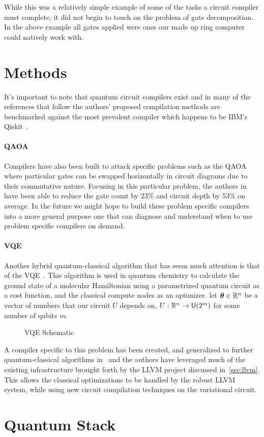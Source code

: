 While this was a relatively simple example of some of the tasks a circuit compiler must complete, it did not begin to touch on the problem of gate decomposition.
In the above example all gates applied were ones our made up ring computer could natively work with.


\section{Methods}

It's important to note that quantum circuit compilers exist and in many of the references that follow the authors' proposed compilation methods are benchmarked against the most prevalent compiler which happens to be IBM's Qiskit~\cite{qiskit}.

\paragraph{QAOA}
Compilers have also been built to attack specific problems such as the \ac{QAOA}~\cite{qaoa} where particular gates can be swapped horizontally in circuit diagrams due to their commutative nature.
Focusing in this particular problem, the authors in~\cite{qaoa-compiler} have been able to reduce the gate count by 23\% and circuit depth by 53\% on average.
In the future we might hope to build these problem specific compilers into a more general purpose one that can diagnose and understand when to use problem specific compilers on demand.

\paragraph{VQE}
Another hybrid quantum-classical algorithm that has seem much attention is that of the \ac{VQE}~\cite{vqe,vqe2}.
This algorithm is used in quantum chemistry to calculate the ground state of a molecular Hamiltonian using a parametrized quantum circuit as a cost function, and the classical compute nodes as an optimizer.
\Eg{} let $\boldsymbol{\theta} \in \mathbb{R}^n$ be a vector of numbers that our circuit $U$ depends on, \ie{} $U: \mathbb{R}^n \to \mathsf{U} (2^m)$ for some number of qubits $m$.
\begin{figure}[ht] %
    \centering
    
    \caption{\acs{VQE} Schematic}\label{fig:vqe}
\end{figure}
A compiler specific to this problem has been created, and generalized to further quantum-classical algorithms in~\cite{vqe-compiler} and the authors have leveraged much of the existing infrastructure brought forth by the LLVM project discussed in~\cref{sec:llvm}.
This allows the classical optimizations to be handled by the robust LLVM system, while using new circuit compilation techniques on the variational circuit.


\section{Quantum Stack}
